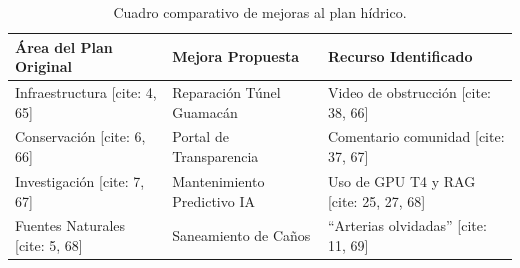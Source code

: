 \documentclass[12pt, a4paper]{article}
\begin{document}
\begin{table}[h!]
\centering
\begin{tabularx}{\textwidth}{@{} >{\raggedright\arraybackslash}X >{\raggedright\arraybackslash}X >{\raggedright\arraybackslash}X @{}}
\toprule
\textbf{Área del Plan Original} & \textbf{Mejora Propuesta} & \textbf{Recurso Identificado} \\ \midrule
Infraestructura [cite: 4, 65] & Reparación Túnel Guamacán & Video de obstrucción [cite: 38, 66] \\
Conservación [cite: 6, 66] & Portal de Transparencia & Comentario comunidad [cite: 37, 67] \\
Investigación [cite: 7, 67] & Mantenimiento Predictivo IA & Uso de GPU T4 y RAG [cite: 25, 27, 68] \\
Fuentes Naturales [cite: 5, 68] & Saneamiento de Caños & ``Arterias olvidadas'' [cite: 11, 69] \\ \bottomrule
\end{tabularx}
\caption{Cuadro comparativo de mejoras al plan hídrico.}
\end{table}
\end{document}
